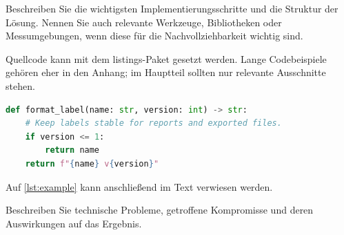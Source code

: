 
Beschreiben Sie die wichtigsten Implementierungsschritte und die Struktur der
Lösung. Nennen Sie auch relevante Werkzeuge, Bibliotheken oder Messumgebungen,
wenn diese für die Nachvollziehbarkeit wichtig sind.

Quellcode kann mit dem listings-Paket gesetzt werden. Lange Codebeispiele
gehören eher in den Anhang; im Hauptteil sollten nur relevante Ausschnitte
stehen.

\begin{lstlisting}[language=Python,caption={Kurzes Beispiel für ein Listing.},label={lst:example}]
def format_label(name: str, version: int) -> str:
    # Keep labels stable for reports and exported files.
    if version <= 1:
        return name
    return f"{name} v{version}"
\end{lstlisting}

Auf \cref{lst:example} kann anschließend im Text verwiesen werden.

Beschreiben Sie technische Probleme, getroffene Kompromisse und deren
Auswirkungen auf das Ergebnis.
